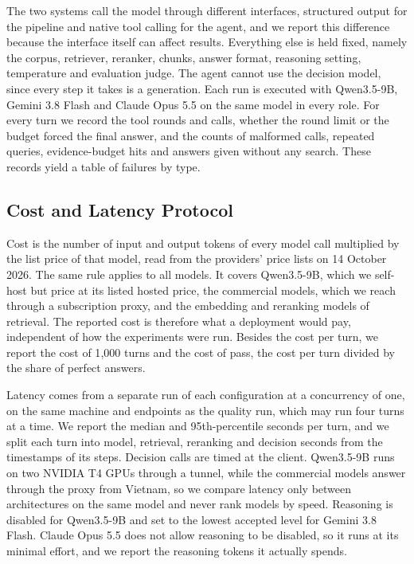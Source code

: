 The two systems call the model through different interfaces, structured output for the pipeline and native tool calling for the agent, and we report this difference because the interface itself can affect results. %
Everything else is held fixed, namely the corpus, retriever, reranker, chunks, answer format, reasoning setting, temperature and evaluation judge. The agent cannot use the decision model, since every step it takes is a generation. Each run is executed with Qwen3.5-9B, Gemini 3.8 Flash and Claude Opus 5.5 on the same model in every role. For every turn we record the tool rounds and calls, whether the round limit or the budget forced the final answer, and the counts of malformed calls, repeated queries, evidence-budget hits and answers given without any search. These records yield a table of failures by type. %

\subsection{Cost and Latency Protocol}\label{sec:cost}

Cost is the number of input and output tokens of every model call multiplied by the list price of that model, read from the providers' price lists on 14 October 2026. The same rule applies to all models. It covers Qwen3.5-9B, which we self-host but price at its listed hosted price, the commercial models, which we reach through a subscription proxy, and the embedding and reranking models of retrieval. The reported cost is therefore what a deployment would pay, independent of how the experiments were run. Besides the cost per turn, we report the cost of 1{,}000 turns and the cost of pass, the cost per turn divided by the share of perfect answers. %

Latency comes from a separate run of each configuration at a concurrency of one, on the same machine and endpoints as the quality run, which may run four turns at a time. We report the median and 95th-percentile seconds per turn, and we split each turn into model, retrieval, reranking and decision seconds from the timestamps of its steps. Decision calls are timed at the client. Qwen3.5-9B runs on two NVIDIA T4 GPUs through a tunnel, while the commercial models answer through the proxy from Vietnam, so we compare latency only between architectures on the same model and never rank models by speed. Reasoning is disabled for Qwen3.5-9B and set to the lowest accepted level for Gemini 3.8 Flash. Claude Opus 5.5 does not allow reasoning to be disabled, so it runs at its minimal effort, and we report the reasoning tokens it actually spends.
